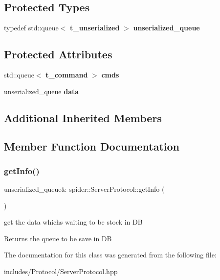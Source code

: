 \subsection*{Protected Types}
\begin{DoxyCompactItemize}
\item 
\mbox{\label{classspider_1_1_server_protocol_af4defcdbe67c7343aaa47e1bd4387dd7}} 
typedef std\+::queue$<$ \textbf{ t\+\_\+unserialized} $>$ {\bfseries unserialized\+\_\+queue}
\end{DoxyCompactItemize}
\subsection*{Protected Attributes}
\begin{DoxyCompactItemize}
\item 
\mbox{\label{classspider_1_1_server_protocol_af3afac390ff0d3f18150b4fbb57d883c}} 
std\+::queue$<$ \textbf{ t\+\_\+command} $>$ {\bfseries cmds}
\item 
\mbox{\label{classspider_1_1_server_protocol_a051e06bc57c2087fc14d38d1e16adb9f}} 
unserialized\+\_\+queue {\bfseries data}
\end{DoxyCompactItemize}
\subsection*{Additional Inherited Members}


\subsection{Member Function Documentation}
\mbox{\label{classspider_1_1_server_protocol_a3941b100fc61ae3815f2c1fec004edc0}} 
\subsubsection{get\+Info()}
{\footnotesize\ttfamily unserialized\+\_\+queue\& spider\+::\+Server\+Protocol\+::get\+Info (\begin{DoxyParamCaption}{ }\end{DoxyParamCaption})}



get the data which\textquotesingle{}s waiting to be stock in DB 

\begin{DoxyReturn}{Returns}
the queue to be save in DB 
\end{DoxyReturn}


The documentation for this class was generated from the following file\+:\begin{DoxyCompactItemize}
\item 
includes/\+Protocol/Server\+Protocol.\+hpp\end{DoxyCompactItemize}
